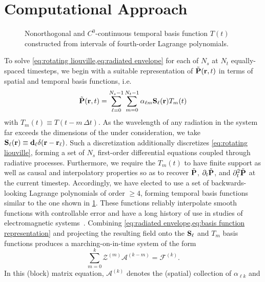 \section{Computational Approach}

\begin{figure}
  
  \caption{\label{fig:interpolation basis} Nonorthogonal and $C^0$-continuous temporal basis function $T(t)$ constructed from intervals of fourth-order Lagrange polynomials.}
\end{figure}
To solve \cref{eq:rotating liouville,eq:radiated envelope} for each of $N_s$ \qds{} at $N_t$ equally-spaced timesteps, we begin with a suitable representation of $\tilde{\vb{P}}(\vb{r}, t)$ in terms of spatial and temporal basis functions, i.e.~
\begin{equation}
  \tilde{\vb{P}}(\vb{r}, t) = \sum_{\ell=0}^{N_s - 1} \sum_{m = 0}^{N_t - 1} \alpha_{\ell m} \vb{S}_\ell(\vb{r}) T_m(t)
  \label{eq:basis function representation}
\end{equation}
with $T_m(t) \equiv T(t - m \, \Delta t)$.
As the wavelength of any radiation in the system far exceeds the dimensions of the \qds{} under consideration, we take $\vb{S}_\ell(\vb{r}) \equiv \vb{d}_\ell \delta(\vb{r} - \vb{r}_\ell)$.
Such a discretization additionally discretizes \cref{eq:rotating liouville}, forming a set of $N_s$ first-order differential equations coupled through radiative processes.
Furthermore, we require the $T_m(t)$ to have finite support as well as causal and interpolatory properties so as to recover $\tilde{\vb{P}}$, $\partial_t \tilde{\vb{P}}$, and $\partial^2_t \tilde{\vb{P}}$ at the current timestep.
Accordingly, we have elected to use a set of backwards-looking Lagrange polynomials of order $\ge 4$, forming temporal basis functions similar to the one shown in \cref{fig:interpolation basis}.
These functions  reliably interpolate smooth functions with controllable error and have a long history of use in studies of electromagnetic systems~\cite{SHANKER,SHANKER,SHANKER}.
Combining \cref{eq:radiated envelope,eq:basis function representation} and projecting the resulting field onto the $\vb{S}_\ell$ and $T_m$ basis functions produces a marching-on-in-time system of the form
\begin{equation}
  \sum_{m = 0}^{k} \mathcal{Z}^{(m)} \mathcal{A}^{(k - m)} = \mathcal{F}^{(k)}.
  \label{eq:zmatrix}
\end{equation}
In this (block) matrix equation, $\mathcal{A}^{(k)}$ denotes the (spatial) collection of $\alpha_{\ell k}$ and
